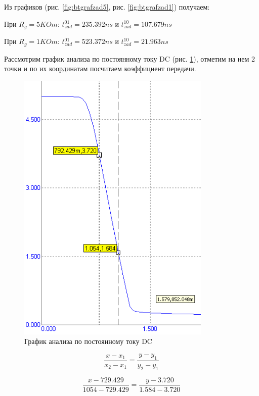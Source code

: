 \documentclass[a4paper,14pt]{article}
\begin{document}
Из графиков (рис. \ref{fig:btgrafzad5}, рис. \ref{fig:btgrafzad1}) получаем:

При $R_g = 5KOm$: $t^{01}_{zad} = 235.392ns$ и $t^{10}_{zad} = 107.679ns$

При $R_g = 1KOm$: $t^{01}_{zad} = 523.372ns$ и $t^{10}_{zad} = 21.963ns$






Рассмотрим график анализа по постоянному току DC (рис. \ref{fig:btdc}), отметим на нем 2 точки и по их координатам посчитаем коэффициент передачи.

\begin{figure}[H]
	\centering
	\includegraphics[width=0.5\linewidth]{image/BT_DC}
	\caption{График анализа по постоянному току DC}
	\label{fig:btdc}
\end{figure}

$$\dfrac{x-x_1}{x_2 - x_1} = \dfrac{y-y_1}{y_2 - y_1}$$

$$\dfrac{x-729.429}{1054 - 729.429} = \dfrac{y-3.720}{1.584 - 3.720}$$


 
\end{document}
